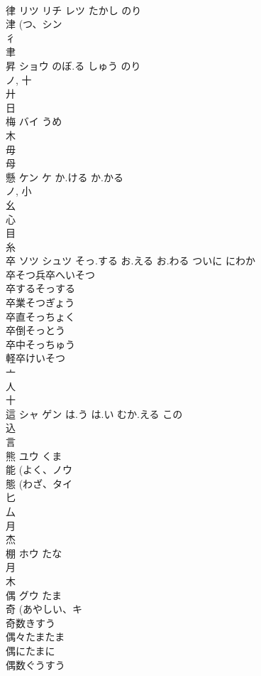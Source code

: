 \documentclass[8pt]{extreport}
\begin{document}
\begin{CJK}{UTF8}{min}
\\	律	リツ リチ レツ	たかし のり	
\\	津 (つ、シン 
\\	彳 
\\	聿 
\\	昇	ショウ	のぼ.る しゅう のり	
\\	ノ, 十 
\\	廾 
\\	日 
\\	梅	バイ	うめ	
\\	木 
\\	毋 
\\	母 
\\	懸	ケン ケ	か.ける か.かる	
\\	ノ, 小 
\\	幺 
\\	心 
\\	目 
\\	糸 
\\	卒	ソツ シュツ	そっ.する お.える お.わる ついに にわか	
\\	卒そつ兵卒へいそつ
\\	卒するそっする
\\	卒業そつぎょう
\\	卒直そっちょく
\\	卒倒そっとう
\\	卒中そっちゅう
\\	軽卒けいそつ
\\	亠 
\\	人 
\\	十 
\\	這	シャ ゲン	は.う は.い むか.える この	
\\	込 
\\	言 
\\	熊	ユウ	くま	
\\	能 (よく、ノウ 
\\	態 (わざ、タイ 
\\	匕 
\\	厶 
\\	月 
\\	杰	
\\	棚	ホウ	たな	
\\	月 
\\	木 
\\	偶	グウ	たま	
\\	奇 (あやしい、キ 
\\	奇数きすう 
\\	偶々たまたま
\\	偶にたまに
\\	偶数ぐうすう

\end{CJK}
\end{document}
